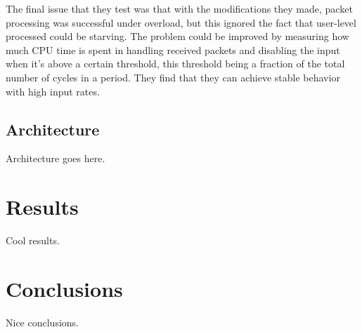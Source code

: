 \documentclass{article}
\begin{document}
The final issue that they test was that with the modifications they made, packet processing was successful under overload, but this ignored the fact that user-level processed could be starving. The problem could be improved by measuring how much CPU time is spent in handling received packets and disabling the input when it's above a certain threshold, this threshold being a fraction of the total number of cycles in a period. They find that they can achieve stable behavior with high input rates.

\subsection{Architecture}

Architecture goes here.

\section{Results}

Cool results.

\section{Conclusions}

Nice conclusions.


\printbibliography
\end{document}
